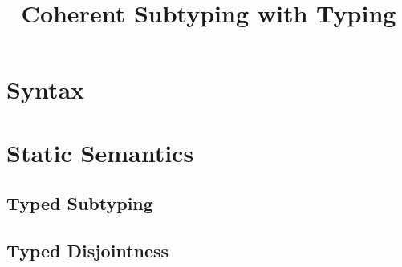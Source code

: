 \documentclass[oneside,a4paper]{article}
\title{\bf Coherent Subtyping with Typing}
\author{}
\date{}
\numberwithin{equation}{section}
\begin{document}
\maketitle

\section{Syntax}
\gram{\otte
  \ottinterrule
  \ottG}

\section{Static Semantics}
\subsection{Typed Subtyping}
\begin{spacing}{0.5}
\begin{small}
\noindent
\ottdefnleaf{}\ottinterrule
\ottdefntsubtyping{}\ottinterrule
\ottdefntwellformed{}\ottinterrule
\end{small}
\end{spacing}

\subsection{Typed Disjointness}
\begin{spacing}{0.5}
\begin{small}
\noindent
\ottdefntdisjointness{}\ottinterrule
\ottdefntnsdisjointness{}\ottinterrule
\end{small}
\end{spacing}


\end{document}
